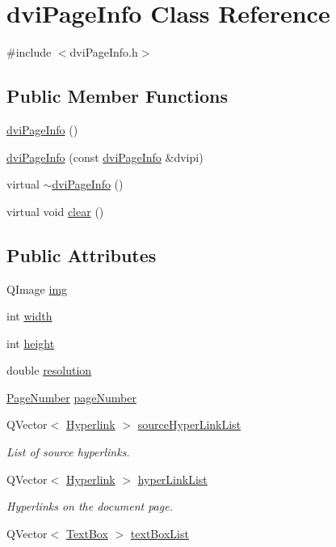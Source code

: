 \hypertarget{classdviPageInfo}{\section{dvi\+Page\+Info Class Reference}
\label{classdviPageInfo}
}


{\ttfamily \#include $<$dvi\+Page\+Info.\+h$>$}

\subsection*{Public Member Functions}
\begin{DoxyCompactItemize}
\item 
\hyperlink{classdviPageInfo_a58a37f38097f55a3c91bfe3ed2dd6eb3}{dvi\+Page\+Info} ()
\item 
\hyperlink{classdviPageInfo_a0fd799a9ccc4c04025102dbd510d3112}{dvi\+Page\+Info} (const \hyperlink{classdviPageInfo}{dvi\+Page\+Info} \&dvipi)
\item 
virtual \hyperlink{classdviPageInfo_adbfb1f58aa28d6aa8253c4b7a6fd35b9}{$\sim$dvi\+Page\+Info} ()
\item 
virtual void \hyperlink{classdviPageInfo_a5c63192fc84da2a3797aba458bccbad9}{clear} ()
\end{DoxyCompactItemize}
\subsection*{Public Attributes}
\begin{DoxyCompactItemize}
\item 
Q\+Image \hyperlink{classdviPageInfo_a2e14764bd0da8f668fdae66527e35db6}{img}
\item 
int \hyperlink{classdviPageInfo_ae69134192cb1f4a18c3eb8e52e52be73}{width}
\item 
int \hyperlink{classdviPageInfo_af6aae8bcca7fab26e073f0cda75197ad}{height}
\item 
double \hyperlink{classdviPageInfo_a1a941bfcf6edfb69562bccf5f392a268}{resolution}
\item 
\hyperlink{classPageNumber}{Page\+Number} \hyperlink{classdviPageInfo_a53def64ce72621ae5c95524cec77ee2e}{page\+Number}
\item 
Q\+Vector$<$ \hyperlink{classHyperlink}{Hyperlink} $>$ \hyperlink{classdviPageInfo_ae3d8b5ce976b2df5c29244577362bb4f}{source\+Hyper\+Link\+List}
\begin{DoxyCompactList}\small\item\em List of source hyperlinks. \end{DoxyCompactList}\item 
Q\+Vector$<$ \hyperlink{classHyperlink}{Hyperlink} $>$ \hyperlink{classdviPageInfo_a1e95c1ee9212ccad20661ed1c141e84e}{hyper\+Link\+List}
\begin{DoxyCompactList}\small\item\em Hyperlinks on the document page. \end{DoxyCompactList}\item 
Q\+Vector$<$ \hyperlink{classTextBox}{Text\+Box} $>$ \hyperlink{classdviPageInfo_a4ba07c38e31cd25fc4987e79cd0968e2}{text\+Box\+List}
\end{DoxyCompactItemize}



